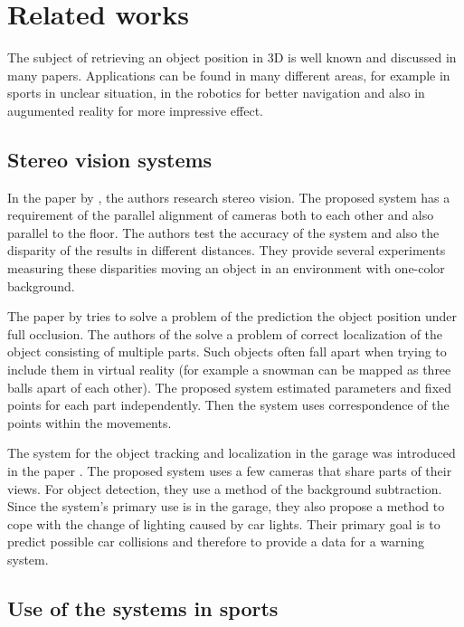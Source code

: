 \chapter{Related works} 

The subject of retrieving an object position in 3D is well known and discussed
in many papers. Applications can be found in many different areas, for example in
sports in unclear situation, in the robotics for better navigation and
also in augumented reality for more impressive effect.

\section{Stereo vision systems}

In the paper by \citet*{zheng2010study}, the authors research stereo vision. The
proposed system has a requirement of the parallel alignment of cameras both to
each other and also parallel to the floor. The authors test the accuracy of the
system and also the disparity of the results in different distances. They
provide several experiments measuring these disparities moving an object in an
environment with one-color background.

The paper by \citet*{black2002multi} tries to solve a problem of the prediction
the object position under full occlusion. The authors of the
\citet*{yonemoto1998tracking} solve a problem of correct localization of the
object consisting of multiple parts. Such objects often fall apart when
trying to include them in virtual reality (for example a snowman can be mapped
as three balls apart of each other). The proposed system estimated parameters and
fixed points for each part independently. Then the system uses correspondence
of the points within the movements.

The system for the object tracking and localization in the garage was introduced
in the paper \citet*{ibisch2015arbitrary}. The proposed system uses a few cameras
that share parts of their views. For object detection, they use a method of the
background subtraction. Since the system's primary use is in the garage, they
also propose a method to cope with the change of lighting caused by car
lights. Their primary goal is to predict possible car collisions and therefore
to provide a data for a warning system.

\section{Use of the systems in sports}


